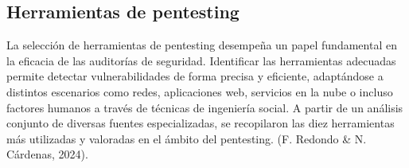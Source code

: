 \documentclass[a4paper, 10pt]{article}
\begin{document}
    

    \subsection{Herramientas de pentesting}

    La selección de herramientas de pentesting desempeña un papel fundamental en la eficacia de las auditorías de seguridad. Identificar las herramientas adecuadas permite detectar vulnerabilidades de forma precisa y eficiente, adaptándose a distintos escenarios 
    como redes, aplicaciones web, servicios en la nube o incluso factores humanos a través de técnicas de ingeniería social. A partir de un análisis conjunto de diversas fuentes especializadas, se recopilaron las diez herramientas 
    más utilizadas y valoradas en el ámbito del pentesting. (F. Redondo \& N. Cárdenas, 2024). \cite{felipe2024}
    
\end{document}
